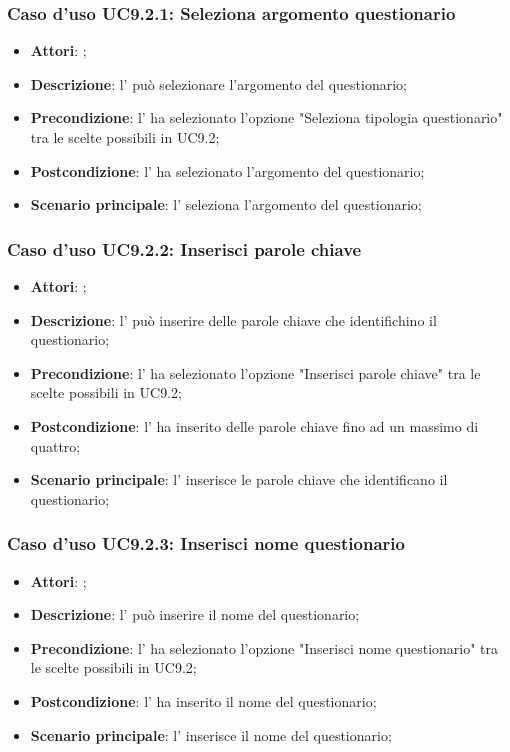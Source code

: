 		\subsubsection{Caso d'uso UC9.2.1: Seleziona argomento questionario}
		\label{UC9.2.1}
		\begin{itemize}
			\item \textbf{Attori}: \uaupro{};
			\item \textbf{Descrizione}: l'\uaupro{} può selezionare l'argomento del questionario; 
			\item \textbf{Precondizione}: l'\uaupro{} ha selezionato l'opzione "Seleziona tipologia questionario" tra le scelte possibili in UC9.2;
			\item \textbf{Postcondizione}: l'\uaupro{} ha selezionato l'argomento del questionario;
			\item \textbf{Scenario principale}: l'\uaupro{} seleziona l'argomento del questionario;
		\end{itemize}
		
		\subsubsection{Caso d'uso UC9.2.2: Inserisci parole chiave}
		\label{UC9.2.2}
		\begin{itemize}
			\item \textbf{Attori}: \uaupro{};
			\item \textbf{Descrizione}: l'\uaupro{} può inserire delle parole chiave che identifichino il questionario; 
			\item \textbf{Precondizione}: l'\uaupro{} ha selezionato l'opzione "Inserisci parole chiave" tra le scelte possibili in UC9.2;
			\item \textbf{Postcondizione}: l'\uaupro{} ha inserito delle parole chiave fino ad un massimo di quattro; 
			\item \textbf{Scenario principale}: l'\uaupro{} inserisce le parole chiave che identificano il questionario;
		\end{itemize}
			
		\subsubsection{Caso d'uso UC9.2.3: Inserisci nome questionario}
		\label{UC9.2.3}
		\begin{itemize}
			\item \textbf{Attori}: \uaupro{};
			\item \textbf{Descrizione}: l'\uaupro{} può inserire il nome del questionario; 
			\item \textbf{Precondizione}: l'\uaupro{} ha selezionato l'opzione "Inserisci nome questionario" tra le scelte possibili in UC9.2;
			\item \textbf{Postcondizione}: l'\uaupro{} ha inserito il nome del questionario; 
			\item \textbf{Scenario principale}: l'\uaupro{} inserisce il nome del questionario;
		\end{itemize}
				
